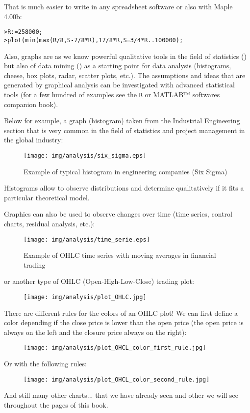 	That is much easier to write in any spreadsheet software or also with Maple 4.00b:

\texttt{>R:=258000;}\\
\texttt{>plot(min(max(R/8,S-7/8*R),17/8*R,S=3/4*R..100000);}

	Also, graphs are as we know powerful qualitative tools in the field of statistics () but also of data mining () as a starting point for data analysis (histograms, cheese, box plots, radar, scatter plots, etc.). The assumptions and ideas that are generated by graphical analysis can be investigated with advanced statistical tools (for a few hundred of examples see the \texttt{R} or MATLAB™ softwares companion book).

Below for example, a graph (histogram) taken from the Industrial Engineering section that is very common in the field of statistics and project management in the global industry:

\begin{figure}[H]
\centering
\texttt{[image: img/analysis/six\_sigma.eps]}
\caption{Example of typical histogram in engineering companies (Six Sigma)}
\end{figure}

Histograms allow to observe distributions and determine qualitatively if it fits a particular theoretical model.

Graphics can also be used to observe changes over time (time series, control charts, residual analysis, etc.):

\begin{figure}[H]
\centering
\texttt{[image: img/analysis/time\_serie.eps]}
\caption{Example of OHLC time series with moving averages in financial trading}
\end{figure}
or another type of OHLC (Open-High-Low-Close) trading plot:
\begin{figure}[H]
\centering
\texttt{[image: img/analysis/plot\_OHLC.jpg]}
\end{figure}
There are different rules for the colors of an OHLC plot! We can first define a color depending if the close price is lower than the open price (the open price is always on the left and the closure price always on the right):
\begin{figure}[H]
\centering
\texttt{[image: img/analysis/plot\_OHCL\_color\_first\_rule.jpg]}
\end{figure}
Or with the following rules:
\begin{figure}[H]
\centering
\texttt{[image: img/analysis/plot\_OHCL\_color\_second\_rule.jpg]}
\end{figure}
And still many other charts... that we have already seen and other we will see throughout the pages of this book.

